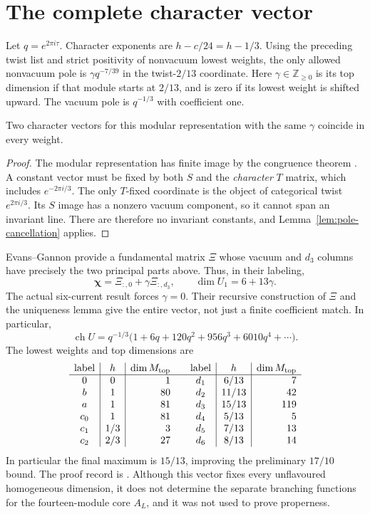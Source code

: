 \section{The complete character vector}
\label{sec:characters}

Let $q=e^{2\pi i\tau}$. Character exponents are $h-c/24=h-1/3$.
Using the preceding twist list and strict positivity of nonvacuum
lowest weights, the only allowed nonvacuum pole is
$\gamma q^{-7/39}$ in the twist-$2/13$ coordinate. Here
$\gamma\in\mathbb Z_{\ge0}$ is its top dimension if that module starts
at $2/13$, and is zero if its lowest weight is shifted upward. The
vacuum pole is $q^{-1/3}$ with coefficient one.

\begin{lemma}\label{lem:haagerup-character-unique}
Two character vectors for this modular representation with the same
$\gamma$ coincide in every weight.
\end{lemma}
\begin{proof}
The modular representation has finite image by the congruence theorem
\cite[Theorem~I]{DLN}. A constant vector must be fixed by both $S$ and
the \emph{character} $T$ matrix, which
includes $e^{-2\pi i/3}$. The only $T$-fixed coordinate is the object
of categorical twist $e^{2\pi i/3}$. Its $S$ image has a nonzero vacuum
component, so it cannot span an invariant line. There are therefore
no invariant constants, and Lemma~\ref{lem:pole-cancellation} applies.
\end{proof}

Evans--Gannon \cite[Sections~1.4 and~2.4, equation~(2.7)]{EG}
provide a fundamental matrix $\Xi$ whose
vacuum and $d_3$ columns have precisely the two principal parts above.
Thus, in their labeling,
\[
 \boldsymbol\chi=\Xi_{:,0}+\gamma\Xi_{:,d_3},
 \qquad\dim U_1=6+13\gamma.
\]
The actual six-current result forces $\gamma=0$. Their recursive
construction of $\Xi$ and the uniqueness lemma give the entire vector,
not just a finite coefficient match. In particular,
\begin{equation}
 \operatorname{ch}U
 =q^{-1/3}\bigl(1+6q+120q^2+956q^3+6010q^4+\cdots\bigr).
 \label{eq:vacuum-character}
\end{equation}
The lowest weights and top dimensions are
\[
\begin{array}{c|c|r@{\qquad}c|c|r}
 \text{label}&h&\dim M_{\rm top}&\text{label}&h&\dim M_{\rm top}\\\hline
 0&0&1&d_1&6/13&7\\
 b&1&80&d_2&11/13&42\\
 a&1&81&d_3&15/13&119\\
 c_0&1&81&d_4&5/13&5\\
 c_1&1/3&3&d_5&7/13&13\\
 c_2&2/3&27&d_6&8/13&14
\end{array}
\]
In particular the final maximum is $15/13$, improving the preliminary
$17/10$ bound. The proof record is
.
Although this vector fixes every unflavoured homogeneous dimension,
it does not determine the separate branching functions for the
fourteen-module core $A_L$, and it was not used to prove properness.

